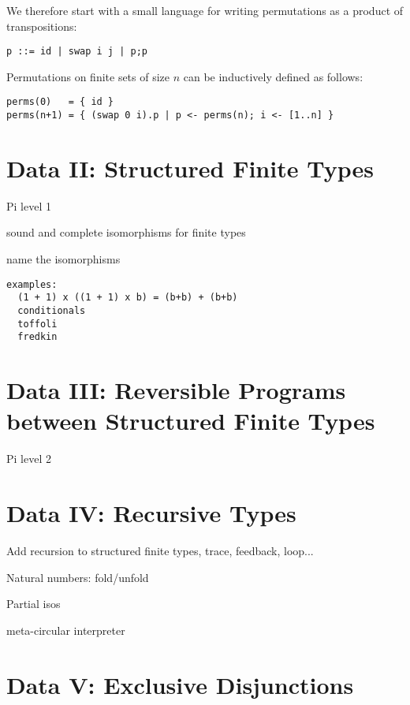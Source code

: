 \documentclass{article}
\begin{document}
We therefore start with a small language for writing permutations as a
product of transpositions:

\begin{verbatim}
p ::= id | swap i j | p;p
\end{verbatim}

Permutations on finite sets of size $n$ can be inductively defined as
follows:
\begin{verbatim}
perms(0)   = { id }
perms(n+1) = { (swap 0 i).p | p <- perms(n); i <- [1..n] }  
\end{verbatim}

\section{Data II: Structured Finite Types}

Pi level 1

sound and complete isomorphisms for finite types

name the isomorphisms

\begin{verbatim}
examples: 
  (1 + 1) x ((1 + 1) x b) = (b+b) + (b+b)
  conditionals
  toffoli
  fredkin
\end{verbatim}

\section{Data III: Reversible Programs between Structured Finite Types}

Pi level 2

\section{Data IV: Recursive Types}

Add recursion to structured finite types, trace, feedback, loop...

Natural numbers: fold/unfold

Partial isos

meta-circular interpreter
 
\section{Data V: Exclusive Disjunctions}
\end{document}

